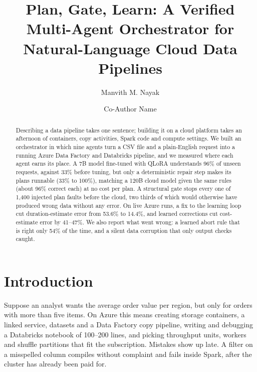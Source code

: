 \documentclass[runningheads]{llncs}
\begin{document}
\title{Plan, Gate, Learn: A Verified Multi-Agent Orchestrator for Natural-Language Cloud Data Pipelines}

\author{Manvith M. Nayak \and Co-Author Name}

\maketitle

\begin{abstract}
Describing a data pipeline takes one sentence; building it on a cloud platform takes an
afternoon of containers, copy activities, Spark code and compute settings. We built an
orchestrator in which nine agents turn a CSV file and a plain-English request into a
running Azure Data Factory and Databricks pipeline, and we measured where each agent earns
its place. A 7B model fine-tuned with QLoRA understands 96\% of unseen requests, against
33\% before tuning, but only a deterministic repair step makes its plans runnable (33\% to
100\%), matching a 120B cloud model given the same rules (about 96\% correct each) at no cost per plan. A structural gate stops
every one of 1{,}400 injected plan faults before the cloud, two thirds of which would
otherwise have produced wrong data without any error. On live Azure runs, a fix to the
learning loop cut duration-estimate error from 53.6\% to 14.4\%, and learned corrections cut
cost-estimate error by 41--47\%. We also report what went wrong: a learned abort rule that
is right only 54\% of the time, and a silent data corruption that only output checks caught.

\end{abstract}

\section{Introduction}

Suppose an analyst wants the average order value per region, but only for orders with more
than five items. On Azure this means creating storage containers, a linked service, datasets
and a Data Factory copy pipeline, writing and debugging a Databricks notebook of 100--200 lines,
and picking throughput units, workers and shuffle partitions that fit the subscription. Mistakes
show up late. A filter on a misspelled column compiles without complaint and fails inside Spark,
after the cluster has already been paid for.
\end{document}
